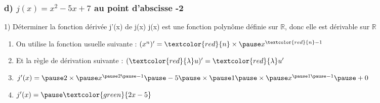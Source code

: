 \documentclass[t]{beamer}
\begin{document}
\begin{frame}
\frametitle{d) $j(x) = x^2 - 5x +7$ au point d'abscisse -2}
\begin{block}{1) Déterminer la fonction dérivée j'(x) de j(x)}
\pause
j(x) est une fonction polynôme définie sur $\mathbb{R}$, \pause donc elle est dérivable sur $\mathbb{R}$
\begin{enumerate}[]
\pause
\item On utilise la fonction usuelle suivante : \pause $ (x^n)' = \textcolor{red}{n} \times \pause x^{\textcolor{red}{n}-1} $
\pause
\item Et la règle de dérivation suivante : \pause $ (\textcolor{red}{\lambda} u)' = \textcolor{red}{\lambda} u' $
\pause
\item \(j'(x) = \pause 2 \times \pause x^{ \pause 2 \pause -1} \pause - 5 \pause \times \pause 1 \pause \times \pause x^{\pause 1 \pause -1} \pause + 0 \)
\pause
\item \(j'(x) = \pause \textcolor{green}{2x - 5} \)
\end{enumerate}
\end{block}


\end{frame}
\end{document}
